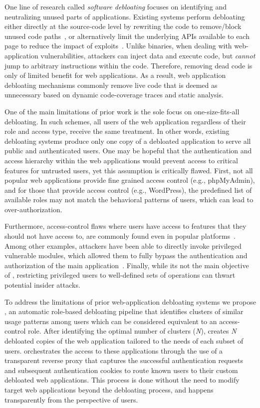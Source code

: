One line of research called \emph{software debloating} focuses on identifying and neutralizing unused parts of applications. 
Existing systems perform debloating either directly at the source-code level by rewriting the code to remove/block unused code paths~\cite{lessismore, mininode}, or alternatively 
limit the underlying APIs available to each page to reduce the impact of exploits~\cite{saphire}. 
Unlike binaries, when dealing with web-application vulnerabilities, attackers can inject data and execute code, but \emph{cannot} jump to arbitrary instructions within the code. 
Therefore, removing dead code is only of limited benefit for web applications. 
As a result, web application debloating mechanisms commonly remove live code that is deemed as unnecessary based on dynamic code-coverage traces and static analysis. 

One of the main limitations of prior work is the sole focus on one-size-fits-all debloating. 
In such schemes, all users of the web application regardless of their role and access type, receive the same treatment. 
In other words, existing debloating systems produce only one copy of a debloated application to serve all public and authenticated users. 
One may be hopeful that the authentication and access hierarchy within the web applications would prevent access to critical features for untrusted users, yet
this assumption is critically flawed. 
First, not all popular web applications provide fine grained access control (e.g., phpMyAdmin), and for those that provide access control (e.g., WordPress), the predefined list of available roles may not match the behavioral patterns of users, which can lead to over-authorization. 

Furthermore, access-control flaws where users have access to features that they should not have access to, are commonly found even in popular platforms~\cite{dalton2009nemesis,doupe2011fear}. 
Among other examples, attackers have been able to directly invoke privileged vulnerable modules, which allowed them to fully bypass the authentication and authorization of the main application~\cite{wpfilemanager}. 
Finally, while its not the main objective of \sys{}, restricting privileged users to well-defined sets of operations can thwart potential insider attacks.

To address the limitations of prior web-application debloating systems
we propose \sys{}, an automatic role-based debloating pipeline that identifies clusters of similar usage patterns among users which can be considered equivalent to an access-control role. 
After identifying the optimal number of clusters (\emph{N}), \sys{} creates \emph{N} debloated copies of the web application tailored to the needs of each subset of users. \sys{} orchestrates the access to these applications through the use of a transparent reverse proxy that captures the successful authentication requests and subsequent authentication cookies to route known users to their custom debloated web applications. 
This process is done without the need to modify target web applications beyond the debloating process, and happens transparently from the perspective of users.

